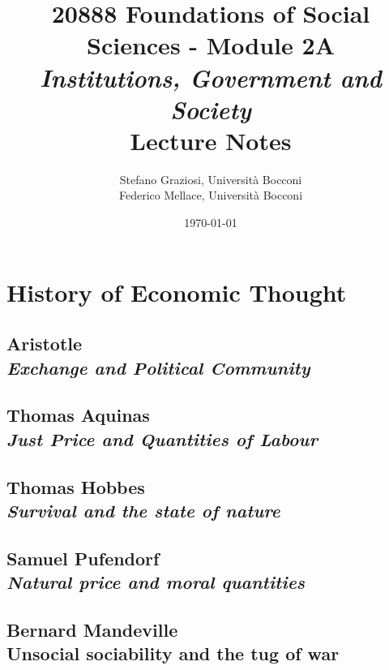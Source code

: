 \documentclass[dvipsnames,12pt]{book}
\title{20888 Foundations of Social Sciences - Module 2A \\[0.2cm] {\Large \textit{Institutions, Government and Society}} \\[1cm] \textbf{Lecture Notes}}
\author{Stefano Graziosi, Università Bocconi \\
        Federico Mellace, Università Bocconi}
\date{\today}
\begin{document}
\maketitle

\tableofcontents

\part{History of Economic Thought}

    \chapter[Exchange and Political Community]{Aristotle \\[0.6cm] \textit{Exchange and Political Community}}

        

    \chapter[Just Price and Quantities of Labour]{Thomas Aquinas \\[0.6cm] \textit{Just Price and Quantities of Labour}}

        

    \chapter[Survival and the state of nature]{Thomas Hobbes \\[0.6cm] \textit{Survival and the state of nature}}

        

    \chapter[Natural price and moral quantities]{Samuel Pufendorf \\[0.6cm] \textit{Natural price and moral quantities}}

        

    \chapter[Unsocial sociability and the tug of war]{Bernard Mandeville \\[0.6cm] Unsocial sociability and the tug of war}
\end{document}
